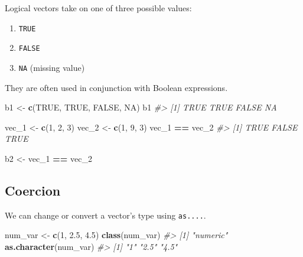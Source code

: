 \documentclass[
]{book}
\newenvironment{Shaded}{\begin{snugshade}}{\end{snugshade}}
\newcommand{\CommentTok}[1]{\textcolor[rgb]{0.56,0.35,0.01}{\textit{#1}}}
\newcommand{\DecValTok}[1]{\textcolor[rgb]{0.00,0.00,0.81}{#1}}
\newcommand{\FloatTok}[1]{\textcolor[rgb]{0.00,0.00,0.81}{#1}}
\newcommand{\KeywordTok}[1]{\textcolor[rgb]{0.13,0.29,0.53}{\textbf{#1}}}
\newcommand{\NormalTok}[1]{#1}
\newcommand{\OperatorTok}[1]{\textcolor[rgb]{0.81,0.36,0.00}{\textbf{#1}}}
\newcommand{\OtherTok}[1]{\textcolor[rgb]{0.56,0.35,0.01}{#1}}
\newcommand{\StringTok}[1]{\textcolor[rgb]{0.31,0.60,0.02}{#1}}
\providecommand{\tightlist}{%
  \setlength{\itemsep}{0pt}\setlength{\parskip}{0pt}}
\begin{document}
Logical vectors take on one of three possible values:

\begin{enumerate}
\def\labelenumi{\arabic{enumi}.}
\tightlist
\item
  \texttt{TRUE}
\item
  \texttt{FALSE}
\item
  \texttt{NA} (missing value)
\end{enumerate}

They are often used in conjunction with Boolean expressions.

\begin{Shaded}
\begin{Highlighting}[]
\NormalTok{b1 <-}\StringTok{ }\KeywordTok{c}\NormalTok{(}\OtherTok{TRUE}\NormalTok{, }\OtherTok{TRUE}\NormalTok{, }\OtherTok{FALSE}\NormalTok{, }\OtherTok{NA}\NormalTok{)}
\NormalTok{b1}
\CommentTok{#> [1]  TRUE  TRUE FALSE    NA}

\NormalTok{vec_}\DecValTok{1}\NormalTok{ <-}\StringTok{ }\KeywordTok{c}\NormalTok{(}\DecValTok{1}\NormalTok{, }\DecValTok{2}\NormalTok{, }\DecValTok{3}\NormalTok{)}
\NormalTok{vec_}\DecValTok{2}\NormalTok{ <-}\StringTok{ }\KeywordTok{c}\NormalTok{(}\DecValTok{1}\NormalTok{, }\DecValTok{9}\NormalTok{, }\DecValTok{3}\NormalTok{)}
\NormalTok{vec_}\DecValTok{1} \OperatorTok{==}\StringTok{ }\NormalTok{vec_}\DecValTok{2}
\CommentTok{#> [1]  TRUE FALSE  TRUE}

\NormalTok{b2 <-}\StringTok{ }\NormalTok{vec_}\DecValTok{1} \OperatorTok{==}\StringTok{ }\NormalTok{vec_}\DecValTok{2}
\end{Highlighting}
\end{Shaded}

\hypertarget{coercion-1}{%
\subsection{Coercion}\label{coercion-1}}

We can change or convert a vector's type using \texttt{as....}.

\begin{Shaded}
\begin{Highlighting}[]
\NormalTok{num_var <-}\StringTok{ }\KeywordTok{c}\NormalTok{(}\DecValTok{1}\NormalTok{, }\FloatTok{2.5}\NormalTok{, }\FloatTok{4.5}\NormalTok{)}
\KeywordTok{class}\NormalTok{(num_var)}
\CommentTok{#> [1] "numeric"}
\KeywordTok{as.character}\NormalTok{(num_var)}
\CommentTok{#> [1] "1"   "2.5" "4.5"}
\end{Highlighting}
\end{Shaded}
\end{document}
